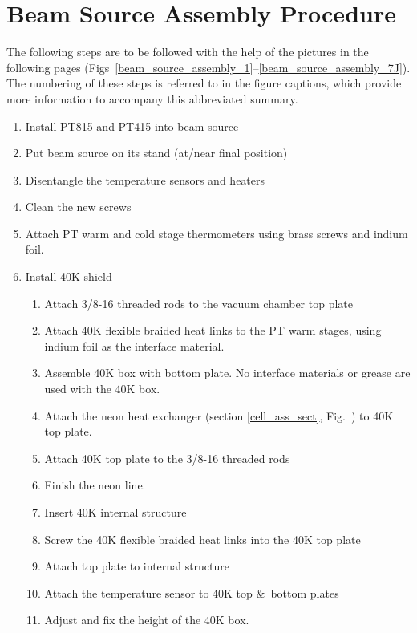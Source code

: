 \section{Beam Source Assembly Procedure}
\label{source_assembly_appendix}

The following steps are to be followed with the help of the pictures in the
following pages
(Figs~\ref{beam_source_assembly_1}--\ref{beam_source_assembly_7J}). The
numbering of these steps is referred to in the figure captions, which provide
more information to accompany this abbreviated summary.

\begin{enumerate}
   \item Install PT815 and PT415 into beam source
   \item Put beam source on its stand (at/near final position)
   \item Disentangle the temperature sensors and heaters
   \item Clean the new screws
   \item Attach PT warm and cold stage thermometers using brass screws and
       indium foil.
   \item Install 40K shield
      \begin{enumerate}[label=\Alph*.]
         \item Attach 3/8-16 threaded rods to the vacuum chamber top plate
         \item Attach 40K flexible braided heat links to the PT warm stages,
             using indium foil as the interface material.
         \item Assemble 40K box with bottom plate. No interface materials or
             grease are used with the 40K box.
         \item Attach the neon heat exchanger (section \ref{cell_ass_sect},
             Fig.~) to 40K top plate.
         \item Attach 40K top plate to the 3/8-16 threaded rods
         \item Finish the neon line.
         \item Insert 40K internal structure
         \item Screw the 40K flexible braided heat links into the 40K top plate
         \item Attach top plate to internal structure
         \item Attach the temperature sensor to 40K top \&\ bottom plates
         \item Adjust and fix the height of the 40K box.

\end{enumerate}
\end{enumerate}
